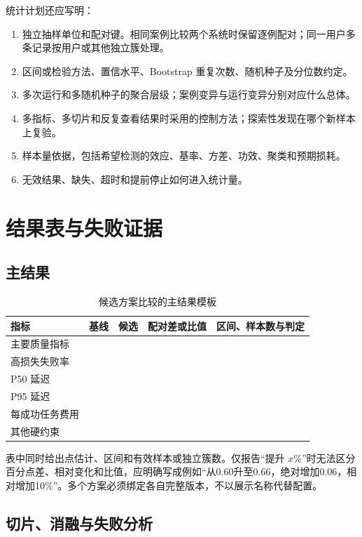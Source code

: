 \documentclass[../textbook.tex]{subfiles}
\begin{document}
统计计划还应写明：
\begin{enumerate}
 \item 独立抽样单位和配对键。相同案例比较两个系统时保留逐例配对；同一用户多条记录按用户或其他独立簇处理。
 \item 区间或检验方法、置信水平、Bootstrap 重复次数、随机种子及分位数约定。
 \item 多次运行和多随机种子的聚合层级；案例变异与运行变异分别对应什么总体。
 \item 多指标、多切片和反复查看结果时采用的控制方法；探索性发现在哪个新样本上复验。
 \item 样本量依据，包括希望检测的效应、基率、方差、功效、聚类和预期损耗。
 \item 无效结果、缺失、超时和提前停止如何进入统计量。
\end{enumerate}

\section{结果表与失败证据}

\subsection{主结果}

\begin{table}[htbp]
\centering
\caption{候选方案比较的主结果模板}\label{tab:appendix-main-results}
\begin{tabularx}{\linewidth}{p{.19\linewidth}p{.15\linewidth}p{.15\linewidth}p{.19\linewidth}X}
\toprule
指标 & 基线 & 候选 & 配对差或比值 & 区间、样本数与判定\\\midrule
主要质量指标 &  &  &  &  \\
高损失失败率 &  &  &  &  \\
P50 延迟 &  &  &  &  \\
P95 延迟 &  &  &  &  \\
每成功任务费用 &  &  &  &  \\
其他硬约束 &  &  &  &  \\
\bottomrule
\end{tabularx}
\end{table}

表中同时给出点估计、区间和有效样本或独立簇数。仅报告“提升 $x\%$”时无法区分百分点差、相对变化和比值，应明确写成例如“从0.60升至0.66，绝对增加0.06，相对增加10\%”。多个方案必须绑定各自完整版本，不以展示名称代替配置。

\subsection{切片、消融与失败分析}
\end{document}

